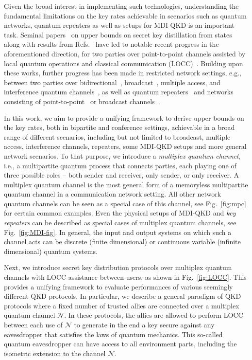 \documentclass[aps,pra,twocolumn,superscriptaddress,longbibliography]{revtex4-1}
\newcommand{\mc}[1]{\mathcal{#1}}
\begin{document}
Given the broad interest in implementing such technologies, understanding the fundamental limitations on the key rates achievable in scenarios such as quantum networks, quantum repeaters as well as setups for MDI-QKD is an important task. Seminal papers~\cite{HHHO05,christandl2004squashed} on upper bounds on secret key distillation from states along with results from Refs.~\cite{BDSW96,VPRK97,VP98,HHH99,Dat09} have led to notable recent progress in the aforementioned direction, for two parties over point-to-point channels assisted by local quantum operations and classical communication (LOCC)~\cite{TGW14,PLOB15,WTB16,CM17}. Building upon these works, further progress has been made in restricted network settings, e.g., between two parties over bidirectional~\cite{DBW17,BDW18,D18thesis}, broadcast~\cite{LP17,seshadreesan2016bounds,TSW17}, multiple access, and interference quantum channels~\cite{LP17}, as well as quantum repeaters~\cite{bauml2015limitations,CM17} and networks consisting of point-to-point~\cite{AML16,RKB+17,pirandola2019capacities} or broadcast channels~\cite{bauml2017fundamental}. 

 
In this work, we aim to provide a unifying framework to derive upper bounds on the key rates, both in bipartite and conference settings, achievable in a broad range of different scenarios, including but not limited to broadcast, multiple access, interference channels, repeaters, some MDI-QKD setups and more general network scenarios. To that purpose, we introduce a \textit{multiplex quantum channel}, i.e., a multipartite quantum process that connects parties, each playing one of three possible roles -- both sender and receiver, only sender, or only receiver. A multiplex quantum channel is the most general form of a
memoryless multipartite quantum channel in a communication network setting. All other network quantum channels can be seen as a special case of this channel, see Fig.~\ref{fig:mpc} for certain common examples. Even the physical setups of MDI-QKD and \textit{key repeaters} can be described as  special cases of multiplex quantum channels, see Fig.~\ref{fig:MDI-fig}. In general, the input and output systems on which such a channel acts can be discrete (finite dimensional) or continuous variable (infinite dimensional) quantum systems.

Next, we introduce secret key distribution protocols over multiplex quantum channels with LOCC-assistance between users, as shown in Fig.~\ref{fig:LOCC}. This provides a unifying framework to evaluate performances of various seemingly different QKD protocols. In particular, we describe a general paradigm of QKD protocols where a fixed number of trusted allies are connected over a multiplex quantum channel $\mathcal{N}$. In these protocols, the allies
are allowed to perform LOCC between each use of $\mc{N}$ to generate in the end a key secure against any eavesdropper that satisfies the laws of quantum mechanics. This so-called quantum eavesdropper can have access to all environment parts, including the isometric extension to the channel $\mc{N}$. 
\end{document}
